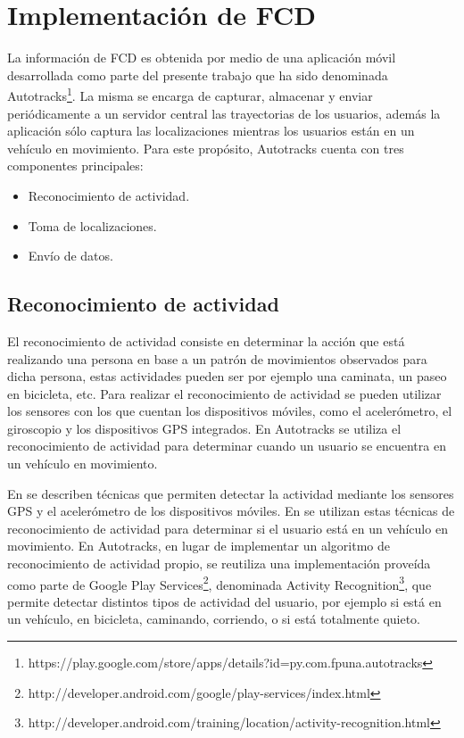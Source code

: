 \section{Implementación de FCD}
\label{floating-car-data}

La información de FCD es obtenida por medio de una aplicación móvil desarrollada como parte del presente trabajo que ha sido denominada Autotracks\footnote{https://play.google.com/store/apps/details?id=py.com.fpuna.autotracks}. La misma se encarga de capturar, almacenar y enviar periódicamente a un servidor central las trayectorias de los usuarios, además la aplicación sólo captura las localizaciones mientras los usuarios están en un vehículo en movimiento. Para este propósito, Autotracks cuenta con tres componentes principales: 
\begin{itemize}
	\item Reconocimiento de actividad.
	\item Toma de localizaciones.
	\item Envío de datos.
\end{itemize}

\subsection{Reconocimiento de actividad}
\label{reconocimiento_actividad}

El reconocimiento de actividad consiste en determinar la acción que está realizando una persona en base a un patrón de movimientos observados para dicha persona, estas actividades pueden ser por ejemplo una caminata, un paseo en bicicleta, etc. Para realizar el reconocimiento de actividad se pueden utilizar los sensores con los que cuentan los dispositivos móviles, como el acelerómetro, el giroscopio y los dispositivos GPS integrados. En Autotracks se utiliza el reconocimiento de actividad para determinar cuando un usuario se encuentra en un vehículo en movimiento.

En \cite{liao2006location,bao2004activity,ravi2005activity} se describen técnicas que permiten detectar la actividad mediante los sensores GPS y el acelerómetro de los dispositivos móviles. En \cite{thiagarajan2010cooperative} se utilizan estas técnicas de reconocimiento de actividad para determinar si el usuario está en un vehículo en movimiento. En Autotracks, en lugar de implementar un algoritmo de reconocimiento de actividad propio, se reutiliza una implementación proveída como parte de Google Play Services\footnote{http://developer.android.com/google/play-services/index.html}, denominada Activity Recognition\footnote{http://developer.android.com/training/location/activity-recognition.html}, que permite detectar distintos tipos de actividad del usuario, por ejemplo si está en un vehículo, en bicicleta, caminando, corriendo, o si está totalmente quieto.


